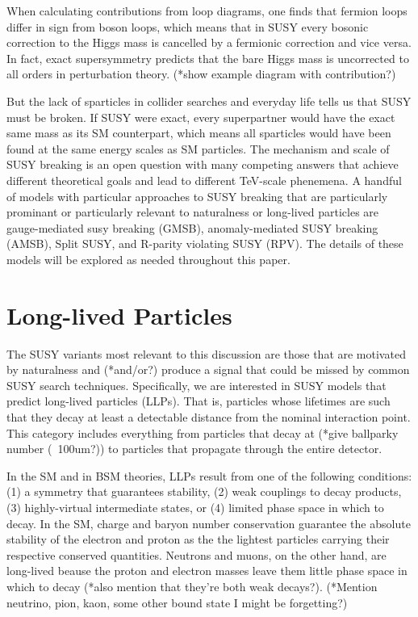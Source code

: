 \documentclass[12pt]{article}
\begin{document}
    When calculating contributions from loop diagrams, one finds that fermion loops differ in sign from boson loops, which means that in SUSY every bosonic correction to the Higgs mass is cancelled by a fermionic correction and vice versa. In fact, exact supersymmetry predicts that the bare Higgs mass is uncorrected to all orders in perturbation theory. (*show example diagram with contribution?)

    But the lack of sparticles in collider searches and everyday life tells us that SUSY must be broken. If SUSY were exact, every superpartner would have the exact same mass as its SM counterpart, which means all sparticles would have been found at the same energy scales as SM particles. The mechanism and scale of SUSY breaking is an open question with many competing answers that achieve different theoretical goals and lead to different TeV-scale phenemena. A handful of models with particular approaches to SUSY breaking that are particularly prominant or particularly relevant to naturalness or long-lived particles are gauge-mediated susy breaking (GMSB), anomaly-mediated SUSY breaking (AMSB), Split SUSY, and R-parity violating SUSY (RPV). The details of these models will be explored as needed throughout this paper.

\section{Long-lived Particles}
    The SUSY variants most relevant to this discussion are those that are motivated by naturalness and (*and/or?) produce a signal that could be missed by common SUSY search techniques. Specifically, we are interested in SUSY models that predict long-lived particles (LLPs). That is, particles whose lifetimes are such that they decay at least a detectable distance from the nominal interaction point. This category includes everything from particles that decay at (*give ballparky number (~100um?)) to particles that propagate through the entire detector. 

    In the SM and in BSM theories, LLPs result from one of the following conditions: (1) a symmetry that guarantees stability, (2) weak couplings to decay products, (3) highly-virtual intermediate states, or (4) limited phase space in which to decay. In the SM, charge and baryon number conservation guarantee the absolute stability of the electron and proton as the the lightest particles carrying their respective conserved quantities. Neutrons and muons, on the other hand, are long-lived beause the proton and electron masses leave them little phase space in which to decay (*also mention that they're both weak decays?). (*Mention neutrino, pion, kaon, some other bound state I might be forgetting?)
\end{document}
